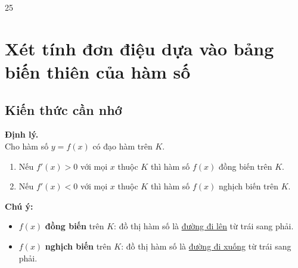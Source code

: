 \setcounter {section} {25}
\setcounter{ex}{0}
\section{Xét tính đơn điệu dựa vào bảng biến thiên của hàm số}
\subsection{Kiến thức cần nhớ}
\begin{khung} 
	\textbf{Định lý. }\\
	Cho hàm số $y=f(x)$ có đạo hàm trên $K$.
	\begin{enumerate}
		\item Nếu $f'(x)>0$ với mọi $x$ thuộc $K$ thì hàm số $f(x)$ đồng biến trên $K$.
		\item Nếu $f'(x)<0$ với mọi $x$ thuộc $K$ thì hàm số $f(x)$ nghịch biến trên $K$.
	\end{enumerate}
	\textbf{Chú ý: }
	\begin{itemize}
		\item $f(x)$  \textbf{đồng biến} trên $K$: đồ thị hàm số là \underline{đường đi lên} từ trái sang phải.
		\item $f(x)$  \textbf{nghịch biến} trên $K$: đồ thị hàm số là \underline{đường đi xuống} từ trái sang phải.
	\end{itemize}
\end{khung}
